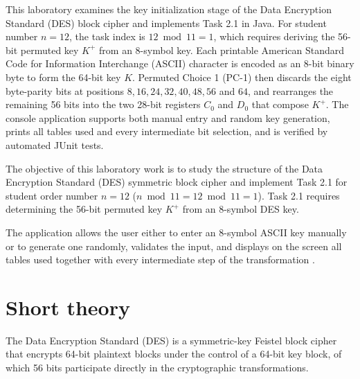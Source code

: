 \documentclass{utmreport}
\begin{document}
\makeutmreporttitlepage
\tableofcontents
\clearpage
\begin{utmabstract}[Abstract]
This laboratory examines the key initialization stage of the Data Encryption Standard (DES) block cipher and implements Task 2.1 in Java. For student number $n=12$, the task index is $12\bmod11=1$, which requires deriving the 56-bit permuted key $K^+$ from an 8-symbol key. Each printable American Standard Code for Information Interchange (ASCII) character is encoded as an 8-bit binary byte to form the 64-bit key $K$. Permuted Choice 1 (PC-1) then discards the eight byte-parity bits at positions $8,16,24,32,40,48,56$ and $64$, and rearranges the remaining 56 bits into the two 28-bit registers $C_0$ and $D_0$ that compose $K^+$. The console application supports both manual entry and random key generation, prints all tables used and every intermediate bit selection, and is verified by automated JUnit tests.
\end{utmabstract}

\utmintroduction
The objective of this laboratory work is to study the structure of the Data Encryption Standard (DES) symmetric block cipher and implement Task 2.1 for student order number $n=12$ ($n\bmod11=12\bmod11=1$). Task 2.1 requires determining the 56-bit permuted key $K^+$ from an 8-symbol DES key.

The application allows the user either to enter an 8-symbol ASCII key manually or to generate one randomly, validates the input, and displays on the screen all tables used together with every intermediate step of the transformation \cite{repo}.

\chapter{Short theory}
The Data Encryption Standard (DES) is a symmetric-key Feistel block cipher that encrypts 64-bit plaintext blocks under the control of a 64-bit key block, of which 56 bits participate directly in the cryptographic transformations.
\end{document}
